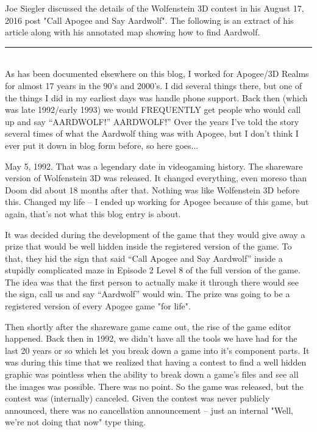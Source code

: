 Joe Siegler discussed the details of the Wolfenstein 3D contest in his August 17, 2016 post "Call Apogee and Say Aardwolf". The following is an extract of his article along with his annotated map showing how to find Aardwolf.\\
\noindent\rule{\textwidth}{0.7pt}
\\
As has been documented elsewhere on this blog, I worked for Apogee/3D Realms for almost 17 years in the 90’s and 2000’s.   I did several things there, but one of the things I did in my earliest days was handle phone support.   Back then (which was late 1992/early 1993) we would FREQUENTLY get people who would call up and say “AARDWOLF!”  AARDWOLF!”   Over the years I’ve told the story several times of what the Aardwolf thing was with Apogee, but I don’t think I ever put it down in blog form before, so here goes...\\
\par
May 5, 1992.  That was a legendary date in videogaming history.  The shareware version of Wolfenstein 3D was released.  It changed everything, even moreso than Doom did about 18 months after that.  Nothing was like Wolfenstein 3D before this.  Changed my life – I ended up working for Apogee because of this game, but again, that’s not what this blog entry is about.\\
\par
It was decided during the development of the game that they would give away a prize that would be well hidden inside the registered version of the game.  To that, they hid the sign that said “Call Apogee and Say Aardwolf” inside a stupidly complicated maze in Episode 2 Level 8 of the full version of the game.  The idea was that the first person to actually make it through there would see the sign, call us and say “Aardwolf” would win.  The prize was going to be a registered version of every Apogee game "for life".\\
\par
Then shortly after the shareware game came out, the rise of the game editor happened.  Back then in 1992, we didn’t have all the tools we have had for the last 20 years or so which let you break down a game into it’s component parts.  It was during this time that we realized that having a contest to find a well hidden graphic was pointless when the ability to break down a game’s files and see all the images was possible.  There was no point.  So the game was released, but the contest was (internally) canceled.  Given the contest was never publicly announced, there was no cancellation announcement – just an internal "Well, we're not doing that now" type thing.\\
